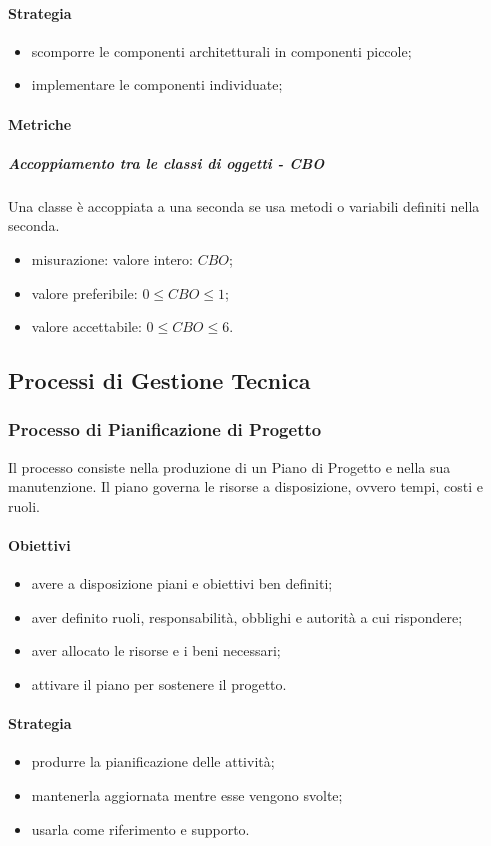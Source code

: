 		\paragraph{Strategia}
		\begin{itemize}
			\item scomporre le componenti architetturali in componenti piccole;
			\item implementare le componenti individuate;
		\end{itemize}
		\paragraph{Metriche}
			\subparagraph{Accoppiamento tra le classi di oggetti - CBO} 
			Una classe è accoppiata a una seconda se usa metodi o variabili definiti nella seconda. 
			\begin{itemize}
				\item misurazione: valore intero: $CBO$;
				\item valore preferibile: $0 \leq CBO \leq 1$;
				\item valore accettabile: $0 \leq CBO \leq 6$.
			\end{itemize}
		
\subsection{Processi di Gestione Tecnica}
	\subsubsection{Processo di Pianificazione di Progetto}
	Il processo consiste nella produzione di un Piano di Progetto e nella sua manutenzione. Il piano governa le risorse a disposizione, ovvero tempi, costi e ruoli.
		\paragraph{Obiettivi}
		\begin{itemize}
			\item avere a disposizione piani e obiettivi ben definiti;
			\item aver definito ruoli, responsabilità, obblighi e autorità a cui rispondere;
			\item aver allocato le risorse e i beni necessari;
			\item attivare il piano per sostenere il progetto.
		\end{itemize}	
		\paragraph{Strategia}
		\begin{itemize}
			\item produrre la pianificazione delle attività;
			\item mantenerla aggiornata mentre esse vengono svolte;
			\item usarla come riferimento e supporto.
		\end{itemize}		
